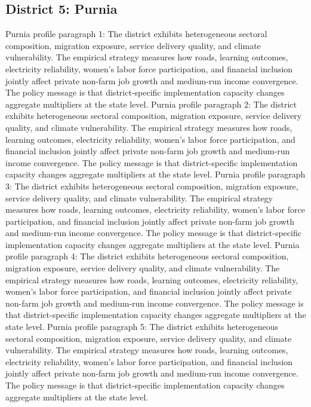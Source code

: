 \documentclass[preprint,12pt]{elsarticle}
\begin{document}
\subsection{District 5: Purnia}
Purnia profile paragraph 1: The district exhibits heterogeneous sectoral composition, migration exposure, service delivery quality, and climate vulnerability. The empirical strategy measures how roads, learning outcomes, electricity reliability, women's labor force participation, and financial inclusion jointly affect private non-farm job growth and medium-run income convergence. The policy message is that district-specific implementation capacity changes aggregate multipliers at the state level.
Purnia profile paragraph 2: The district exhibits heterogeneous sectoral composition, migration exposure, service delivery quality, and climate vulnerability. The empirical strategy measures how roads, learning outcomes, electricity reliability, women's labor force participation, and financial inclusion jointly affect private non-farm job growth and medium-run income convergence. The policy message is that district-specific implementation capacity changes aggregate multipliers at the state level.
Purnia profile paragraph 3: The district exhibits heterogeneous sectoral composition, migration exposure, service delivery quality, and climate vulnerability. The empirical strategy measures how roads, learning outcomes, electricity reliability, women's labor force participation, and financial inclusion jointly affect private non-farm job growth and medium-run income convergence. The policy message is that district-specific implementation capacity changes aggregate multipliers at the state level.
Purnia profile paragraph 4: The district exhibits heterogeneous sectoral composition, migration exposure, service delivery quality, and climate vulnerability. The empirical strategy measures how roads, learning outcomes, electricity reliability, women's labor force participation, and financial inclusion jointly affect private non-farm job growth and medium-run income convergence. The policy message is that district-specific implementation capacity changes aggregate multipliers at the state level.
Purnia profile paragraph 5: The district exhibits heterogeneous sectoral composition, migration exposure, service delivery quality, and climate vulnerability. The empirical strategy measures how roads, learning outcomes, electricity reliability, women's labor force participation, and financial inclusion jointly affect private non-farm job growth and medium-run income convergence. The policy message is that district-specific implementation capacity changes aggregate multipliers at the state level.
\end{document}
